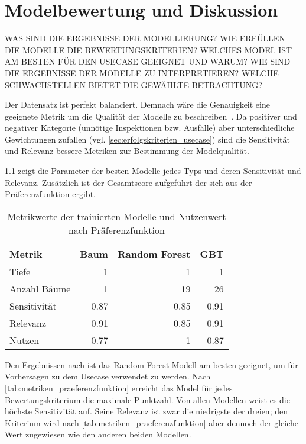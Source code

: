 \chapter{Modelbewertung und Diskussion}
\label{ch:modelbewertung}
WAS SIND DIE ERGEBNISSE DER MODELLIERUNG? WIE ERFÜLLEN DIE MODELLE DIE BEWERTUNGSKRITERIEN? WELCHES MODEL IST AM BESTEN FÜR DEN USECASE GEEIGNET UND WARUM? WIE SIND DIE ERGEBNISSE DER MODELLE ZU INTERPRETIEREN? WELCHE SCHWACHSTELLEN BIETET DIE GEWÄHLTE BETRACHTUNG?

Der Datensatz ist perfekt balanciert. Demnach wäre die Genauigkeit eine geeignete Metrik um die Qualität der Modelle zu beschreiben~\cite[S.~282]{Muller.2017}. Da positiver und negativer Kategorie (unnötige Inspektionen bzw. Ausfälle) aber unterschiedliche Gewichtungen zufallen (vgl. \cref{sec:erfolgskriterien_usecase}) sind die Sensitivität und Relevanz bessere Metriken zur Bestimmung der Modelqualität.

\cref{tab:metrikwerte_der_trainierten_modelle} zeigt die Parameter der besten Modelle jedes Typs und deren Sensitivität und Relevanz. Zusätzlich ist der Gesamtscore aufgeführt der sich aus der Präferenzfunktion ergibt.

\begin{table}[ht]
	\raggedright
	\begin{tabularx}{\textwidth}{ | l | r | r | r|}
		\hline
		\rowcolor{lightgray}
		Metrik & Baum & Random Forest & GBT\\
		\hline
		Tiefe & 1 & 1 & 1\\
		Anzahl Bäume & 1 & 19 & 26\\
		Sensitivität & \num{0.87} & \num{0.85} & \num{0.91}\\
		Relevanz & \num{0.91} & \num{0.85} & \num{0.91}\\
		\hline
		\hline
		Nutzen & \num{0.77} & \num{1} & \num{0.87}\\
		\hline
	\end{tabularx}
	\caption{Metrikwerte der trainierten Modelle und Nutzenwert nach Präferenzfunktion}%
	\label{tab:metrikwerte_der_trainierten_modelle}	%
\end{table}


Den Ergebnissen nach ist das Random Forest Modell am besten geeignet, um für Vorhersagen zu dem Usecase verwendet zu werden. Nach \cref{tab:metriken_praeferenzfunktion} erreicht das Model für jedes Bewertungskriterium die maximale Punktzahl. Von allen Modellen weist es die höchste Sensitivität auf. Seine Relevanz ist zwar die niedrigste der dreien; den Kriterium wird nach \cref{tab:metriken_praeferenzfunktion} aber dennoch der gleiche Wert zugewiesen wie den anderen beiden Modellen.

